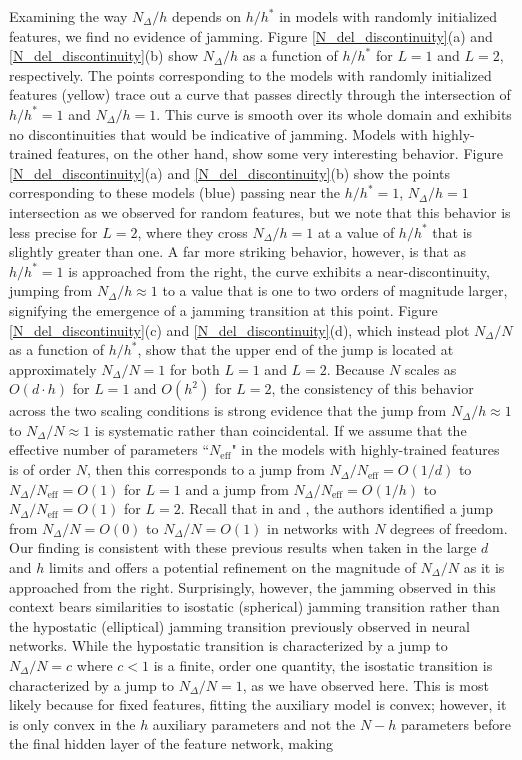 \documentclass[11pt]{article}
\begin{document}
Examining the way $N_\Delta/h$ depends on $h/h^*$ in models with randomly initialized features, we find no evidence of jamming. Figure \ref{N_del_discontinuity}(a) and \ref{N_del_discontinuity}(b) show $N_\Delta/h$ as a function of $h/h^*$ for $L=1$ and $L=2$, respectively. The points corresponding to the models with randomly initialized features (yellow) trace out a curve that passes directly through the intersection of $h/h^*=1$ and $N_\Delta/h=1$. This curve is smooth over its whole domain and exhibits no discontinuities that would be indicative of jamming. Models with highly-trained features, on the other hand, show some very interesting behavior. Figure \ref{N_del_discontinuity}(a) and \ref{N_del_discontinuity}(b) show the points corresponding to these models (blue) passing near the $h/h^*=1$, $N_\Delta/h=1$ intersection as we observed for random features, but we note that this behavior is less precise for $L=2$, where they cross $N_\Delta/h=1$ at a value of $h/h^*$ that is slightly greater than one. A far more striking behavior, however, is that as $h/h^*=1$ is approached from the right, the curve exhibits a near-discontinuity, jumping from $N_\Delta/h\approx1$ to a value that is one to two orders of magnitude larger, signifying the emergence of a jamming transition at this point. Figure \ref{N_del_discontinuity}(c) and \ref{N_del_discontinuity}(d), which instead plot $N_\Delta/N$ as a function of $h/h^*$, show that the upper end of the jump is located at approximately $N_\Delta/N = 1$ for both $L=1$ and $L=2$. Because $N$ scales as $O(d\cdot h)$ for $L=1$ and $O(h^2)$ for $L=2$, the consistency of this behavior across the two scaling conditions is strong evidence that the jump from $N_\Delta/h \approx 1$ to $N_\Delta/N \approx 1$ is systematic rather than coincidental. If we assume that the effective number of parameters ``$N_\text{eff}$" in the models with highly-trained features is of order $N$, then this corresponds to a jump from $N_\Delta / N_\text{eff} = O(1/d)$ to $N_\Delta / N_\text{eff} = O(1)$ for $L=1$ and a jump from $N_\Delta / N_\text{eff} = O(1/h)$ to $N_\Delta / N_\text{eff} = O(1)$ for $L=2$. Recall that in \cite{geigerJammingTransitionParadigm2019} and \cite{spiglerJammingTransitionOverparametrization2019}, the authors identified a jump from $N_\Delta/N = O(0)$ to $N_\Delta/N = O(1)$ in networks with $N$ degrees of freedom. Our finding is consistent with these previous results when taken in the large $d$ and $h$ limits and offers a potential refinement on the magnitude of $N_\Delta/N$ as it is approached from the right. Surprisingly, however, the jamming observed in this context bears similarities to isostatic (spherical) jamming transition rather than the hypostatic (elliptical) jamming transition previously observed in neural networks. While the hypostatic transition is characterized by a jump to $N_\Delta/N = c$ where $c < 1$ is a finite, order one quantity, the isostatic transition is characterized by a jump to $N_\Delta/N=1$, as we have observed here. This is most likely because for fixed features, fitting the auxiliary model is convex; however, it is only convex in the $h$ auxiliary parameters and not the $N-h$ parameters before the final hidden layer of the feature network, making 
\end{document}
